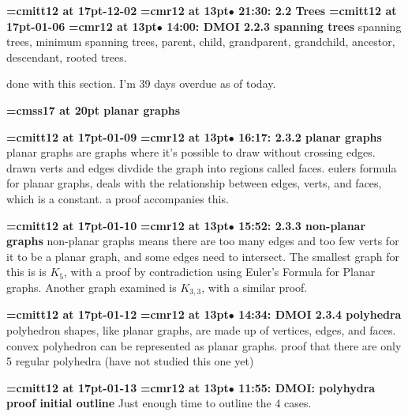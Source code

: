 {\medskip\noindent\bf\font\titlefont=cmitt12 at 17pt-12-02}\medskip
{\smallskip\noindent\bf\font\titlefont=cmr12 at 13pt\titlefont $\bullet$ 21:30: 2.2 Trees}\smallskip
{\medskip\noindent\bf\font\titlefont=cmitt12 at 17pt-01-06}\medskip
{\smallskip\noindent\bf\font\titlefont=cmr12 at 13pt\titlefont $\bullet$ 14:00: DMOI 2.2.3 spanning trees}\smallskip
spanning trees, minimum spanning trees, parent, child, grandparent, grandchild, ancestor, descendant, rooted trees.
\par

done with this section. I'm 39 days overdue as of today.
\par

{\medskip\noindent\bf\font\titlefont=cmss17 at 20pt planar graphs}\medskip

{\medskip\noindent\bf\font\titlefont=cmitt12 at 17pt-01-09}\medskip
{\smallskip\noindent\bf\font\titlefont=cmr12 at 13pt\titlefont $\bullet$ 16:17: 2.3.2 planar graphs}\smallskip
planar graphs are graphs where it's possible to draw without crossing edges. drawn verts and edges divdide the graph into regions called faces. eulers formula for planar graphs, deals with the relationship between edges, verts, and faces, which is a constant. a proof accompanies this.
\par

{\medskip\noindent\bf\font\titlefont=cmitt12 at 17pt-01-10}\medskip
{\smallskip\noindent\bf\font\titlefont=cmr12 at 13pt\titlefont $\bullet$ 15:52: 2.3.3 non-planar graphs}\smallskip
non-planar graphs means there are too many edges and too few verts for it to be a planar graph, and some edges need to intersect. The smallest graph for this is is $K_5$, with a proof by contradiction using Euler's Formula for Planar graphs. Another graph examined is $K_{3, 3}$, with a similar proof.
\par

{\medskip\noindent\bf\font\titlefont=cmitt12 at 17pt-01-12}\medskip
{\smallskip\noindent\bf\font\titlefont=cmr12 at 13pt\titlefont $\bullet$ 14:34: DMOI 2.3.4 polyhedra}\smallskip
polyhedron shapes, like planar graphs, are made up of vertices, edges, and faces. convex polyhedron can be represented as planar graphs. proof that there are only 5 regular polyhedra (have not studied this one yet)
\par

{\medskip\noindent\bf\font\titlefont=cmitt12 at 17pt-01-13}\medskip
{\smallskip\noindent\bf\font\titlefont=cmr12 at 13pt\titlefont $\bullet$ 11:55: DMOI: polyhydra proof initial outline}\smallskip
Just enough time to outline the 4 cases.
\par

